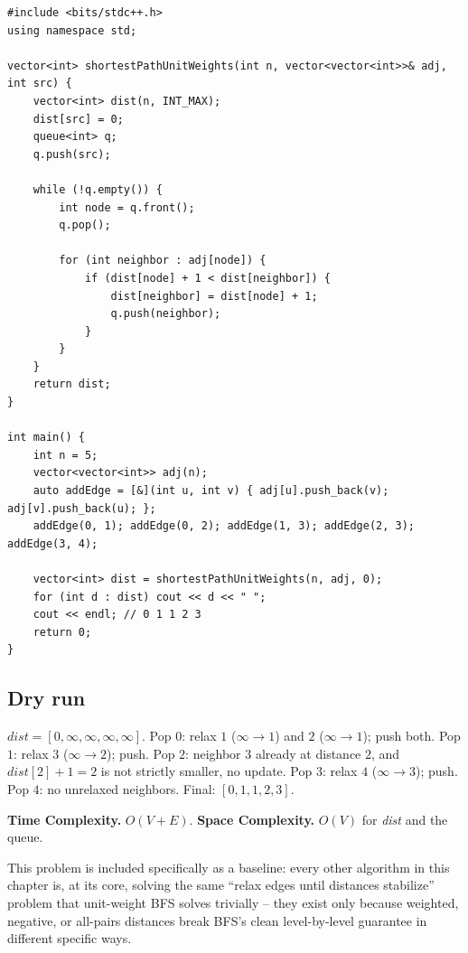 \begin{lstlisting}
#include <bits/stdc++.h>
using namespace std;

vector<int> shortestPathUnitWeights(int n, vector<vector<int>>& adj, int src) {
    vector<int> dist(n, INT_MAX);
    dist[src] = 0;
    queue<int> q;
    q.push(src);

    while (!q.empty()) {
        int node = q.front();
        q.pop();

        for (int neighbor : adj[node]) {
            if (dist[node] + 1 < dist[neighbor]) {
                dist[neighbor] = dist[node] + 1;
                q.push(neighbor);
            }
        }
    }
    return dist;
}

int main() {
    int n = 5;
    vector<vector<int>> adj(n);
    auto addEdge = [&](int u, int v) { adj[u].push_back(v); adj[v].push_back(u); };
    addEdge(0, 1); addEdge(0, 2); addEdge(1, 3); addEdge(2, 3); addEdge(3, 4);

    vector<int> dist = shortestPathUnitWeights(n, adj, 0);
    for (int d : dist) cout << d << " ";
    cout << endl; // 0 1 1 2 3
    return 0;
}
\end{lstlisting}

\subsection*{Dry run}


$\textit{dist}=[0,\infty,\infty,\infty,\infty]$. Pop $0$: relax $1$
($\infty\to1$) and $2$ ($\infty\to1$); push both. Pop $1$: relax $3$
($\infty\to2$); push. Pop $2$: neighbor $3$ already at distance $2$,
and $\textit{dist}[2]+1=2$ is not strictly smaller, no update. Pop
$3$: relax $4$ ($\infty\to3$); push. Pop $4$: no unrelaxed neighbors.
Final: $[0,1,1,2,3]$.

\begin{complexitybox}
\textbf{Time Complexity.} $O(V+E)$.
\textbf{Space Complexity.} $O(V)$ for \textit{dist} and the queue.
\end{complexitybox}

\begin{takeawaybox}
This problem is included specifically as a baseline: every other
algorithm in this chapter is, at its core, solving the same
``relax edges until distances stabilize'' problem that unit-weight BFS
solves trivially -- they exist only because weighted, negative, or
all-pairs distances break BFS's clean level-by-level guarantee in
different specific ways.
\end{takeawaybox}

